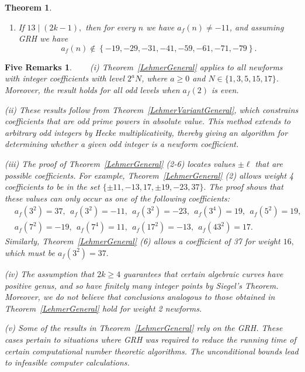\documentclass[12pt]{amsart}
\newtheorem*{FiveRemarks}{Five Remarks}
\newtheorem{thm}{Theorem}[section]
\newcommand{\?}{\color{red}?}
\numberwithin{equation}{section}
\begin{document}
\begin{thm}
\begin{enumerate}
\item If $13\mid (2k-1),$ then for every $n$ we have $a_f(n)\neq -11$, and assuming GRH we have
 \begin{displaymath}
a_f(n)\not \in \left \{-19, -29, -31, -41, -59, -61, -71, -79\right\}.
\end{displaymath}
\end{enumerate}
\end{thm}


\begin{FiveRemarks} \ \ \ \newline 
\noindent
(i) Theorem~\ref{LehmerGeneral} applies to all newforms \cite{OnoTaguchi} with integer coefficients with level $2^aN$, where $a\geq 0$ and
$N\in \{1, 3, 5, 15, 17\}$. Moreover,
the result holds  for all odd levels when $a_f(2)$ is even. 

\smallskip
\noindent
(ii) These results follow from Theorem~\ref{LehmerVariantGeneral}, which  constrains
coefficients that are odd prime powers in absolute value. This method extends to arbitrary odd integers by Hecke multiplicativity, thereby giving an algorithm for determining whether a given odd integer is a newform coefficient. 

\smallskip
\noindent
(iii) The proof of Theorem~\ref{LehmerGeneral} (2-6)  locates values $\pm \ell$ that are possible coefficients.
For example, Theorem~\ref{LehmerGeneral} (2) allows weight 4 coefficients to be in the set
$\{\pm 11, -13, 17, \pm 19, -23, 37\}.$
 The proof shows that these values can only occur as one of the following coefficients:
\begin{displaymath}
\begin{split}
&a_f(3^2)=37,\  \  a_f(3^2)=-11,\  \ a_f(3^2)=-23, \ \  a_f(3^4)=19,\ \ a_f(5^2)=19, \\
&a_f(7^2)=-19,\ \ a_f(7^4)=11,\ \   a_f(17^2)=-13, \ \ a_f(43^2)=17.
\end{split}
\end{displaymath}
Similarly, Theorem~\ref{LehmerGeneral} (6) allows a coefficient  of 37 for weight $16,$
which must be $a_f(3^2)=37.$ 

\smallskip
\noindent
(iv) The assumption that $2k\geq 4$ guarantees that certain algebraic curves have positive genus,
and so have finitely many integer points by Siegel's Theorem.  Moreover, we do not believe that conclusions analogous to those obtained in Theorem~\ref{LehmerGeneral} hold for weight 2 newforms.

\smallskip
\noindent
(v) Some of the results in Theorem~\ref{LehmerGeneral} rely on the GRH.  These cases pertain to situations where GRH was required to  reduce the running time of certain computational number theoretic algorithms. The unconditional bounds lead to infeasible computer calculations.

\end{FiveRemarks}
\end{document}
